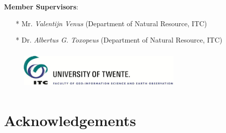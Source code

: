 \documentclass[10pt, a4paper]{article}
\begin{document}
\vspace{2em}

\textbf{Member Supervisors}: \\
\begin{itemize}
	\item[* ] Mr. \textit{Valentijn Venus} (Department of Natural Resource, ITC)
	\item[* ] Dr. \textit{Albertus G. Toxopeus} (Department of Natural Resource, ITC)
\end{itemize}

\begin{figure}[h]
	\begin{center}
	\includegraphics[height=2cm,width=8cm]{ITC-logo.jpg}
	\end{center}
\end{figure}
\pagebreak

\section*{}
	\tableofcontents 
\pagebreak

\section*{Acknowledgements}
\end{document}
